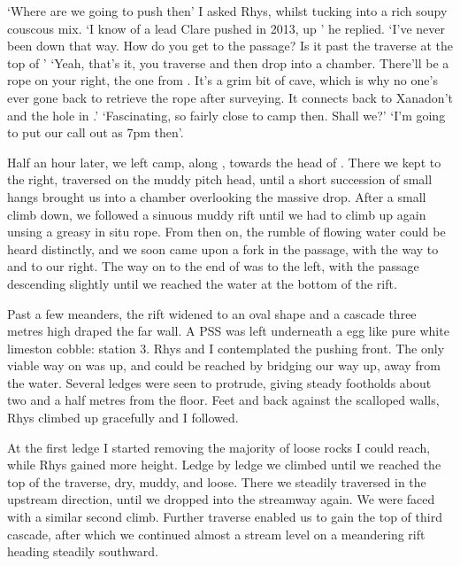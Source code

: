 `Where are we going to push then' I asked Rhys, whilst tucking into a rich soupy couscous mix.
`I know of a lead Clare pushed in 2013, up ' he replied.
`I've never been down that way. How do you get to the passage? Is it past the traverse at the top of '
`Yeah, that's it, you traverse and then drop into a chamber. There'll be a rope on your right, the one from . It's a grim bit of cave, which is why no one's ever gone back to retrieve the rope after surveying. It connects back to Xanadon't and the hole in .'
`Fascinating, so fairly close to camp then. Shall we?'
`I'm going to put our call out as 7pm then'.

Half an hour later, we left camp, along , towards the head of . There we kept to the right, traversed on the muddy pitch head, until a short succession of small hangs brought us into a chamber overlooking the massive drop. After a small climb down, we followed a sinuous muddy rift until we had to climb up again unsing a greasy in situ rope. From then on, the rumble of flowing water could be heard distinctly, and we soon came upon a fork in the passage, with the way to  and  to our right. The way on to the end of  was to the left, with the passage descending slightly until we reached the water at the bottom of the rift.

Past a few meanders, the rift widened to an oval shape and a cascade three metres high draped the far wall. A PSS was left underneath a egg like pure white limeston cobble:  station 3. Rhys and I contemplated the pushing front. The only viable way on was up, and could be reached by bridging our way up, away from the water. Several ledges were seen to protrude, giving steady footholds about two and a half metres from the floor. Feet and back against the scalloped walls, Rhys  climbed up gracefully and I followed.

At the first ledge I started removing the majority of loose rocks I could reach, while Rhys gained more height. Ledge by ledge we climbed until we reached the top of the traverse, dry, muddy, and loose. There we steadily traversed in the upstream direction, until we dropped into the streamway again. We were faced with a similar second climb. Further traverse enabled us to gain the top of third cascade, after which we continued almost a stream level on a meandering rift heading steadily southward.

